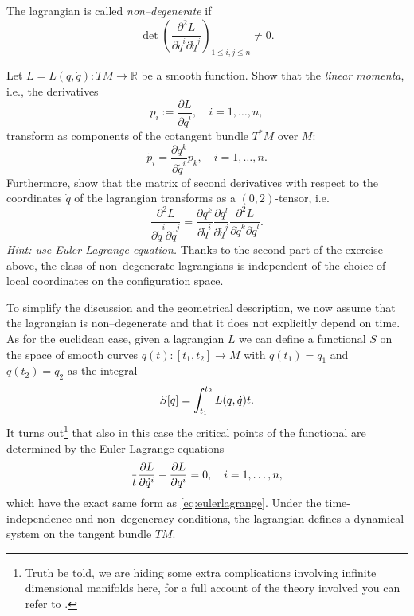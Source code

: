 \documentclass[english,fontsize=11pt,paper=a5,oneside]{scrbook}
\newcommand{\R}{\mathbb{R}}
\let\d\relax
\newcommand{\d}{\mathrm{d}}
\theoremstyle{definition}
\newenvironment{exercise}
  {\pushQED{\qed}\renewcommand{\qedsymbol}{$\maltese$}\exercisex}
  {\popQED\endexercisex}
\begin{document}
The lagrangian is called \emph{non--degenerate} if
\begin{equation}
  \det %
  \left(\frac{\partial^2 L}{\partial \dot{q}^i \partial \dot{q}^j}\right)_{1\leq i,j\leq n}
  \neq 0.
\end{equation}

\begin{exercise}\label{exe:coordinatesInd}
  Let $L=L(q,\dot q):TM \to \R$ be a smooth function. Show that the \emph{linear momenta}, i.e., the derivatives
  \begin{equation}
    p_i := \frac{\partial L}{\partial \dot q^i}, \quad i=1,\ldots,n,
  \end{equation}
  transform as components of the cotangent bundle $T^* M$ over $M$:
  \begin{equation}
    \widetilde p_i = \frac{\partial q^k}{\partial {\widetilde q}^i} p_k, \quad i=1,\ldots,n.
  \end{equation}
  Furthermore, show that the matrix of second derivatives with respect to the coordinates $\dot q$ of the lagrangian transforms as a $(0,2)$-tensor, i.e.
  \begin{equation}
    \frac{\partial^2 L}{\partial \dot{\widetilde q}^i \partial \dot{\widetilde q}^j} =
    \frac{\partial q^k}{\partial {\widetilde q}^i}\frac{\partial q^l}{\partial {\widetilde q}^j}
    \frac{\partial^2 L}{\partial \dot{q}^k \partial \dot{q}^l}.
  \end{equation}
  \textit{Hint: use Euler-Lagrange equation.}
\end{exercise}
Thanks to the second part of the exercise above, the class of non--degenerate lagrangians is independent of the choice of local coordinates on the configuration space.

To simplify the discussion and the geometrical description, we now assume that the lagrangian is non--degenerate and that it does not explicitly depend on time.
As for the euclidean case, given a lagrangian $L$ we can define a functional $S$ on the space of smooth curves $q(t): [t_1,t_2] \to M$ with $q(t_1) = q_1$ and $q(t_2) = q_2$ as the integral
\begin{equation}
  S[q] = \int_{t_1}^{t_2} L(q,\dot q) \d t.
\end{equation}
It turns out\footnote{Truth be told, we are hiding some extra complications involving infinite dimensional manifolds here, for a full account of the theory involved you can refer to \cite[Chapters 7 and 8]{book:marsdenratiu}.} that also in this case the critical points of the functional are determined by the Euler-Lagrange equations
\begin{equation}
  \frac{\d}{\d t}\frac{\partial L}{\partial \dot q^i} - \frac{\partial L}{\partial q^i} =0, \quad i=1,\ldots,n,
\end{equation}
which have the exact same form as \eqref{eq:eulerlagrange}.
Under the time-independence and non--degeneracy conditions, the lagrangian defines a dynamical system on the tangent bundle $TM$.
\end{document}
